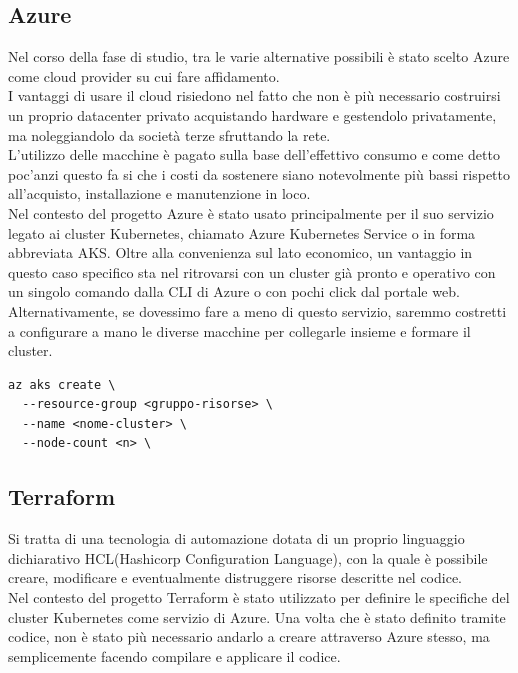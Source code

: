 \documentclass[a4paper,12pt]{report}
\begin{document}
\subsection{Azure}
Nel corso della fase di studio, tra le varie alternative possibili è stato scelto Azure come cloud provider su cui fare affidamento.\\
I vantaggi di usare il cloud risiedono nel fatto che non è più necessario costruirsi un proprio datacenter privato acquistando hardware e gestendolo privatamente, ma noleggiandolo da società terze sfruttando la rete.\cite{cloud}\\
L'utilizzo delle macchine è pagato sulla base dell'effettivo consumo e come detto poc'anzi questo fa si che i costi da sostenere siano notevolmente più bassi rispetto all'acquisto, installazione e manutenzione in loco.\\
Nel contesto del progetto Azure è stato usato principalmente per il suo servizio legato ai cluster Kubernetes, chiamato Azure Kubernetes Service o in forma abbreviata AKS. Oltre alla convenienza sul lato economico, un vantaggio in questo caso specifico sta nel ritrovarsi con un cluster già pronto e operativo con un singolo comando dalla CLI di Azure o con pochi click dal portale web.\\
Alternativamente, se dovessimo fare a meno di questo servizio, saremmo costretti a configurare a mano le diverse macchine per collegarle insieme e formare il cluster. 
\begin{lstlisting}[caption={\\\textit{Esempio di comando per creare un cluster Kubernetes come servizio di Azure da Azure CLI. Gli argomenti passati sono il gruppo risorse in cui deployare la risorsa di tipo AKS, il nome attribuito al cluster e il numero di nodi desiderati.}}]
az aks create \
  --resource-group <gruppo-risorse> \
  --name <nome-cluster> \
  --node-count <n> \
\end{lstlisting}

\subsection{Terraform}
Si tratta di una tecnologia di automazione dotata di un proprio linguaggio dichiarativo HCL(Hashicorp Configuration Language), con la quale è possibile creare, modificare e eventualmente distruggere risorse descritte nel codice.\\
Nel contesto del progetto Terraform è stato utilizzato per definire le specifiche del cluster Kubernetes come servizio di Azure. Una volta che è stato definito tramite codice, non è stato più necessario andarlo a creare attraverso Azure stesso, ma semplicemente facendo compilare e applicare il codice.
\end{document}
